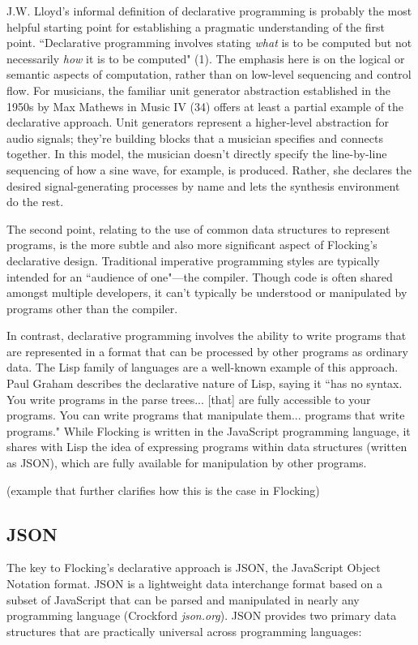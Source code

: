 \documentclass{article}
\begin{document}
J.W. Lloyd's informal definition of declarative programming is probably the most helpful starting point for establishing a pragmatic understanding of the first point. ``Declarative programming involves stating {\it what} is to be computed but not necessarily {\it how} it is to be computed" (1). The emphasis here is on the logical or semantic aspects of computation, rather than on low-level sequencing and control flow. For musicians, the familiar unit generator abstraction established in the 1950s by Max Mathews in Music IV (34) offers at least a partial example of the declarative approach. Unit generators represent a higher-level abstraction for audio signals; they're building blocks that a musician specifies and connects together. In this model, the musician doesn't directly specify the line-by-line sequencing of how a sine wave, for example, is produced. Rather, she declares the desired signal-generating processes by name and lets the synthesis environment do the rest.

The second point, relating to the use of common data structures to represent programs, is the more subtle and also more significant aspect of Flocking’s declarative design. Traditional imperative programming styles are typically intended for an ``audience of one"---the compiler. Though code is often shared amongst multiple developers, it can’t typically be understood or manipulated by programs other than the compiler.

In contrast, declarative programming involves the ability to write programs that are represented in a format that can be processed by other programs as ordinary data. The Lisp family of languages are a well-known example of this approach. Paul Graham describes the declarative nature of Lisp, saying it ``has no syntax. You write programs in the parse trees... [that] are fully accessible to your programs. You can write programs that manipulate them... programs that write programs." While Flocking is written in the JavaScript programming language, it shares with Lisp the idea of expressing programs within data structures (written as JSON), which are fully available for manipulation by other programs.

(example that further clarifies how this is the case in Flocking)

\subsection{JSON}

The key to Flocking's declarative approach is JSON, the JavaScript Object Notation format. JSON is a lightweight data interchange format based on a subset of JavaScript that can be parsed and manipulated in nearly any programming language (Crockford {\it json.org}). JSON provides two primary data structures that are practically universal across programming languages:
\end{document}
